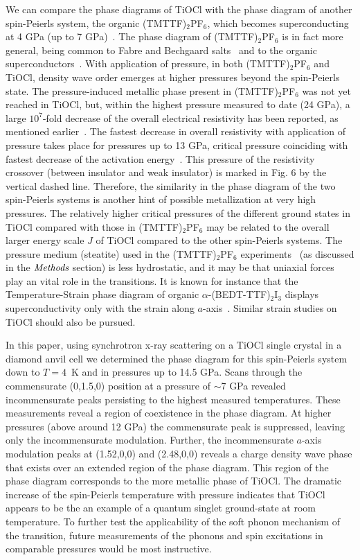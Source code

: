\documentclass[preprint,superscriptaddress,amsmath,amssymb,aps,prl]{revtex4-1}
\begin{document}
We can compare the phase diagrams of TiOCl with the phase diagram of another spin-Peierls system, the organic (TMTTF)$_{2}$PF$_{6}$, which becomes superconducting at 4 GPa (up to 7 GPa)~\cite{Adachi2000,Jaccard2001}. The phase diagram of (TMTTF)$_{2}$PF$_{6}$ is in fact more general, being common to Fabre and Bechgaard salts~\cite{Jaccard2001,Yu2004,Dressel2007} and to the organic superconductors~\cite{Jerome1991}. With application of pressure, in both (TMTTF)$_{2}$PF$_{6}$ and TiOCl, density wave order emerges at higher pressures beyond the spin-Peierls state. The pressure-induced metallic phase present in (TMTTF)$_{2}$PF$_{6}$ was not yet reached in TiOCl, but, within the highest pressure measured to date (24 GPa), a large $10^7$-fold decrease of the overall electrical resistivity has been reported, as mentioned earlier~\cite{Forthaus2008}. The fastest decrease in overall resistivity with application of pressure takes place for pressures up to 13 GPa, critical pressure coinciding with fastest decrease of the activation energy~\cite{Forthaus2008}. This pressure of the resistivity crossover (between insulator and weak insulator) is marked in Fig. 6 by the vertical dashed line. Therefore, the similarity in the phase diagram of the two spin-Peierls systems is another hint of possible metallization at very high pressures. The relatively higher critical pressures of the different ground states in TiOCl compared with those in (TMTTF)$_{2}$PF$_{6}$ may be related to the overall larger energy scale $J$ of TiOCl compared to the other spin-Peierls systems. The pressure medium (steatite) used in the (TMTTF)$_{2}$PF$_{6}$ experiments~\cite{Jaccard2001} (as discussed in the $\emph{Methods}$ section) is less hydrostatic, and it may be that uniaxial forces play an vital role in the transitions. It is known for instance that the Temperature-Strain phase diagram of organic $\alpha$-(BEDT-TTF)$_{2}$I$_{3}$ displays superconductivity only with the strain along $a$-axis~\cite{Tajima2002}. Similar strain studies on TiOCl should also be pursued.

In this paper, using synchrotron x-ray scattering on a TiOCl single crystal in a diamond anvil cell we determined the phase diagram for this spin-Peierls system down to $T=4$~K and in pressures up to 14.5 GPa. Scans through the commensurate (0,1.5,0) position at a pressure of $\sim$7 GPa revealed incommensurate peaks persisting to the highest measured temperatures.  These measurements reveal a region of coexistence in the phase diagram. At higher pressures (above around 12 GPa) the commensurate peak is suppressed, leaving only the incommensurate modulation. Further, the incommensurate $a$-axis modulation peaks at (1.52,0,0) and (2.48,0,0) reveals a charge density wave phase that exists over an extended region of the phase diagram. This region of the phase diagram corresponds to the more metallic phase of TiOCl. The dramatic increase of the spin-Peierls temperature with pressure indicates that TiOCl appears to be the an example of a quantum singlet ground-state at room temperature. To further test the applicability of the soft phonon mechanism of the transition, future measurements of the phonons and spin excitations in comparable pressures would be most instructive.
\end{document}

